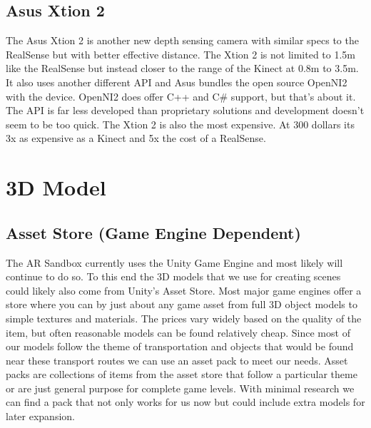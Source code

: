 \documentclass[letterpaper, 10pt, onecolumn, draftclsnofoot]{IEEEtran}
\begin{document}
    \subsection{Asus Xtion 2}
    The Asus Xtion 2 is another new depth sensing camera with similar specs to the RealSense but with better effective distance. The Xtion 2 is not limited to 1.5m like the RealSense but instead closer to the range of the Kinect at 0.8m to 3.5m. It also uses another different API and Asus bundles the open source OpenNI2 with the device. OpenNI2 does offer C++ and C\# support, but that's about it. The API is far less developed than proprietary solutions and development doesn’t seem to be too quick. The Xtion 2 is also the most expensive. At 300 dollars its 3x as expensive as a Kinect and 5x the cost of a RealSense.
    
\section{3D Model}
    \subsection{Asset Store (Game Engine Dependent)}
    The AR Sandbox currently uses the Unity Game Engine and most likely will continue to do so. To this end the 3D models that we use for creating scenes could likely also come from Unity’s Asset Store. Most major game engines offer a store where you can by just about any game asset from full 3D object models to simple textures and materials. The prices vary widely based on the quality of the item, but often reasonable models can be found relatively cheap. Since most of our models follow the theme of transportation and objects that would be found near these transport routes we can use an asset pack to meet our needs. Asset packs are collections of items from the asset store that follow a particular theme or are just general purpose for complete game levels. With minimal research we can find a pack that not only works for us now but could include extra models for later expansion. 
    
\end{document}
